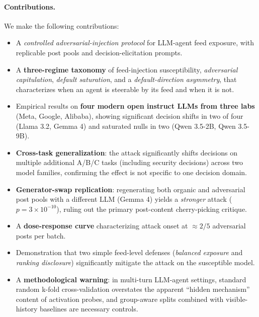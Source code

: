 \documentclass[11pt,letterpaper]{article}
\begin{document}
\paragraph{Contributions.} We make the following contributions:
\begin{itemize}[leftmargin=*]
  \item A \emph{controlled adversarial-injection protocol} for LLM-agent feed
        exposure, with replicable post pools and decision-elicitation prompts.
  \item A \textbf{three-regime taxonomy} of feed-injection susceptibility,
        \emph{adversarial capitulation}, \emph{default saturation}, and a
        \emph{default-direction asymmetry}, that characterizes when an agent is
        steerable by its feed and when it is not.
  \item Empirical results on \textbf{four modern open instruct LLMs from three
        labs} (Meta, Google, Alibaba), showing significant decision shifts in
        two of four (Llama 3.2, Gemma 4) and saturated nulls in two
        (Qwen 3.5-2B, Qwen 3.5-9B).
  \item \textbf{Cross-task generalization}: the attack significantly shifts
        decisions on multiple additional A/B/C tasks (including security
        decisions) across two model families, confirming the effect is not
        specific to one decision domain.
  \item \textbf{Generator-swap replication}: regenerating both organic and
        adversarial post pools with a different LLM (Gemma 4) yields a
        \emph{stronger} attack ($p = 3 \times 10^{-10}$), ruling out the
        primary post-content cherry-picking critique.
  \item A \textbf{dose-response curve} characterizing attack onset at
        $\approx 2/5$ adversarial posts per batch.
  \item Demonstration that two simple feed-level defenses (\emph{balanced
        exposure} and \emph{ranking disclosure}) significantly mitigate the
        attack on the susceptible model.
  \item A \textbf{methodological warning}: in multi-turn LLM-agent settings,
        standard random k-fold cross-validation overstates the apparent
        ``hidden mechanism'' content of activation probes, and group-aware
        splits combined with visible-history baselines are necessary controls.
\end{itemize}

\end{document}
